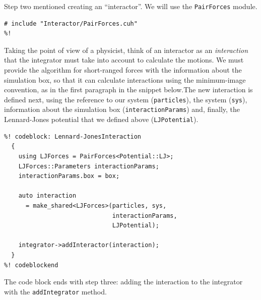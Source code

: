 Step two mentioned creating an ``interactor''. We will use the
\texttt{PairForces} module.
\begin{lstlisting}
# include "Interactor/PairForces.cuh"
%!
\end{lstlisting}

Taking the point of view of a physicist, think of an interactor as an 
\textit{interaction} that the integrator must take into account to calculate the 
motions. We must provide the algorithm for short-ranged forces with the 
information about the simulation box, so that it can calculate interactions 
using the minimum-image convention, as in the first paragraph in the snippet 
below.The new interaction is defined next, using the reference to our system 
(\texttt{particles}), the system (\texttt{sys}), information about the 
simulation box (\texttt{interactionParams}) and, finally, the Lennard-Jones 
potential that we defined above (\texttt{LJPotential}).

\begin{lstlisting}
%! codeblock: Lennard-JonesInteraction
  {
    using LJForces = PairForces<Potential::LJ>;
    LJForces::Parameters interactionParams;
    interactionParams.box = box;

    auto interaction
      = make_shared<LJForces>(particles, sys,
                              interactionParams,
                              LJPotential);

    integrator->addInteractor(interaction);
  }
%! codeblockend
\end{lstlisting}
The code block ends with step three: adding the interaction to the integrator
with the \texttt{addIntegrator} method.

